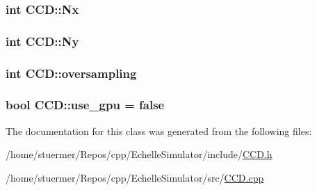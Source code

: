 \subsubsection[{\texorpdfstring{Nx}{Nx}}]{\setlength{\rightskip}{0pt plus 5cm}int C\+C\+D\+::\+Nx\hspace{0.3cm}{\ttfamily [private]}}\hypertarget{class_c_c_d_abe89ab0452f494147601a5c323e52588}{}\label{class_c_c_d_abe89ab0452f494147601a5c323e52588}
\subsubsection[{\texorpdfstring{Ny}{Ny}}]{\setlength{\rightskip}{0pt plus 5cm}int C\+C\+D\+::\+Ny\hspace{0.3cm}{\ttfamily [private]}}\hypertarget{class_c_c_d_a31f3c760f9ead50dbd3c7272314ddc9e}{}\label{class_c_c_d_a31f3c760f9ead50dbd3c7272314ddc9e}
\subsubsection[{\texorpdfstring{oversampling}{oversampling}}]{\setlength{\rightskip}{0pt plus 5cm}int C\+C\+D\+::oversampling\hspace{0.3cm}{\ttfamily [private]}}\hypertarget{class_c_c_d_a147d14d779dc54c05b3fc65a4e97c698}{}\label{class_c_c_d_a147d14d779dc54c05b3fc65a4e97c698}
\subsubsection[{\texorpdfstring{use\+\_\+gpu}{use_gpu}}]{\setlength{\rightskip}{0pt plus 5cm}bool C\+C\+D\+::use\+\_\+gpu = false}\hypertarget{class_c_c_d_abeed44146ecffcd143263700413a41bd}{}\label{class_c_c_d_abeed44146ecffcd143263700413a41bd}


The documentation for this class was generated from the following files\+:\begin{DoxyCompactItemize}
\item 
/home/stuermer/\+Repos/cpp/\+Echelle\+Simulator/include/\hyperlink{_c_c_d_8h}{C\+C\+D.\+h}\item 
/home/stuermer/\+Repos/cpp/\+Echelle\+Simulator/src/\hyperlink{_c_c_d_8cpp}{C\+C\+D.\+cpp}\end{DoxyCompactItemize}

